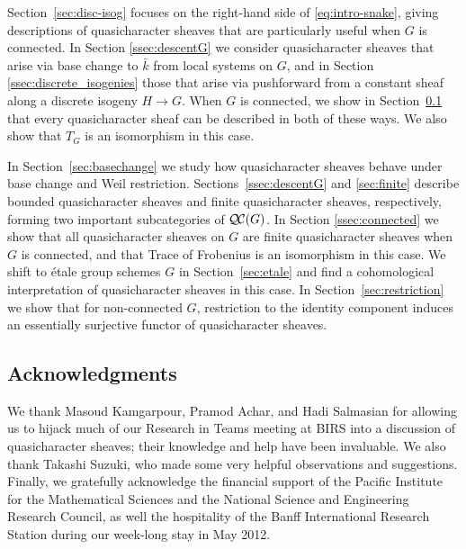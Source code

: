 \documentclass{amsart}
\theoremstyle{plain}
\theoremstyle{definition}
\theoremstyle{remark}
\newcommand{\bFq}{\bar{k}}
\newcommand{\Fq}{k}
\newcommand{\TrFrob}[1]{T_{#1}}
\newcommand{\QC}{{\mathcal{Q\hskip-0.8pt C}}}
\begin{document}
Section~\ref{sec:disc-isog} focuses on the right-hand side of \eqref{eq:intro-snake},
giving descriptions of quasicharacter sheaves that are particularly useful when $G$ is connected.  In Section \ref{ssec:descentG}
we consider quasicharacter sheaves that arise via base change to $\bFq$ from local systems on $G$, and in Section \ref{ssec:discrete_isogenies}
those that arise via pushforward from a constant sheaf along a discrete isogeny $H \to G$.  When $G$ is connected,
we show in Section~\ref{} that every quasicharacter sheaf can be described in both of these ways.  We also show that $\TrFrob{G}$ is an isomorphism
in this case.

In Section~\ref{sec:basechange} we study how quasicharacter sheaves behave under base change
and Weil restriction.
Sections~\ref{ssec:descentG} and \ref{sec:finite} describe bounded quasicharacter sheaves and finite quasicharacter sheaves, respectively,
forming two important subcategories of $\QC(G)$.
In Section \ref{ssec:connected} we show that all quasicharacter sheaves on $G$ are finite quasicharacter sheaves when $G$ is connected, and that Trace of Frobenius is an isomorphism in this case.
We shift to \'etale group schemes $G$ in Section~\ref{sec:etale} and find a cohomological interpretation
of quasicharacter sheaves in this case.
In Section~\ref{sec:restriction} we show that for non-connected $G$, restriction to the identity component
induces an essentially surjective functor of quasicharacter sheaves.

\subsection{Acknowledgments}
We thank Masoud Kamgarpour, Pramod Achar, and Hadi Salmasian
for allowing us to hijack much of our Research in Teams meeting at BIRS into a discussion of
quasicharacter sheaves; their knowledge and help have been invaluable.
We also thank Takashi Suzuki, who made some very helpful observations and suggestions.
%
Finally, we gratefully acknowledge the financial support of the Pacific Institute for the Mathematical Sciences
and the National Science and Engineering Research Council,
as well the hospitality of the Banff International Research Station during our week-long stay in May 2012.
\end{document}
